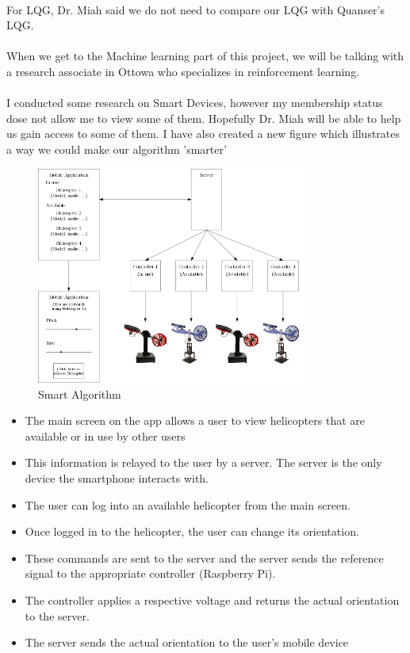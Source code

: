 \documentclass[fontsize=11pt, %
                             paper=letter, %
                             openany, %
                             captions=tableheading,
                             index=totoc,
                             hyperref]{labbook}
\begin{document}
\begin{addmargin}[0cm]{0cm}
\\
For LQG, Dr. Miah said we do not need to compare our LQG with Quanser's LQG.\\
\\
When we get to the Machine learning part of this project, we will be talking with a research associate in Ottowa who specializes in reinforcement learning.\\
\\
I conducted some research on Smart Devices, however my membership status dose not allow me to view some of them.  Hopefully Dr. Miah will be able to help us gain access to some of them.  I have also created a new figure which illustrates a way we could make our algorithm 'smarter'
\begin{figure}
  \centering
  \includegraphics[width=0.8\textwidth]{figs/img/03052019/Smart_Alg}
  \caption{Smart Algorithm}
  \label{fig:Smart_Alg}
\end{figure}

\begin{itemize}
    \item The main screen on the app allows a user to view helicopters that are available or in use by other users
    \item This information is relayed to the user by a server.  The server is the only device the smartphone interacts with.
    \item The user can log into an available helicopter from the main screen.
    \item Once logged in to the helicopter, the user can change its orientation.
    \item These commands are sent to the server and the server sends the reference signal to the appropriate controller (Raspberry Pi).
    \item The controller applies a respective voltage and returns the actual orientation to the server.
    \item The server sends the actual orientation to the user's mobile device
\end{itemize}



\end{addmargin}
\end{document}
